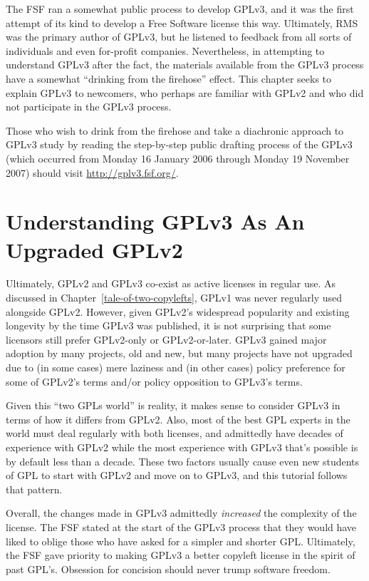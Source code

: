 The FSF ran a somewhat public process to develop GPLv3, and it was the first
attempt of its kind to develop a Free Software license this way.  Ultimately,
RMS was the primary author of GPLv3, but he listened to feedback from all
sorts of individuals and even for-profit companies.  Nevertheless, in
attempting to understand GPLv3 after the fact, the materials available from
the GPLv3 process have a somewhat ``drinking from the firehose'' effect.
This chapter seeks to explain GPLv3 to newcomers, who perhaps are familiar
with GPLv2 and who did not participate in the GPLv3 process.

Those who wish to drink from the firehose and take a diachronic approach to
GPLv3 study by reading the step-by-step public drafting process of the GPLv3 (which
occurred from Monday 16 January 2006 through Monday 19 November 2007) should
visit \url{http://gplv3.fsf.org/}.

\section{Understanding GPLv3 As An Upgraded GPLv2}

Ultimately, GPLv2 and GPLv3 co-exist as active licenses in regular use.  As
discussed in Chapter~\ref{tale-of-two-copylefts}, GPLv1 was never regularly
used alongside GPLv2.  However, given GPLv2's widespread popularity and
existing longevity by the time GPLv3 was published, it is not surprising that
some licensors still prefer GPLv2-only or GPLv2-or-later.  GPLv3 gained major
adoption by many projects, old and new, but many projects have not upgraded
due to (in some cases) mere laziness and (in other cases) policy preference
for some of GPLv2's terms and/or policy opposition to GPLv3's terms.

Given this ``two GPLs world'' is reality, it makes sense to consider GPLv3 in
terms of how it differs from GPLv2.  Also, most of the best GPL experts in
the world must deal regularly with both licenses, and admittedly have decades
of experience with GPLv2 while the most experience with GPLv3 that's possible
is by default less than a decade.  These two factors usually cause even new
students of GPL to start with GPLv2 and move on to GPLv3, and this tutorial
follows that pattern.

Overall, the changes made in GPLv3 admittedly \textit{increased} the
complexity of the license.  The FSF stated at the start of the GPLv3 process
that they would have liked to oblige those who have asked for a simpler and
shorter GPL\@.  Ultimately, the FSF gave priority to making GPLv3 a better
copyleft license in the spirit of past GPL's.  Obsession for concision should
never trump software freedom.

